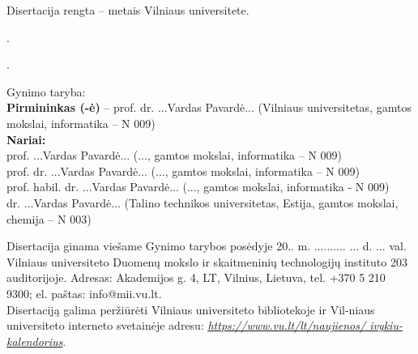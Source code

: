 \newpage
\thispagestyle{empty}                   %

\noindent\nohyphens{Disertacija rengta {\thesisPreparationStartYear}--{\thesisYear} metais Vilniaus universitete.}


\vspace{1cm}
.

.

\vspace{1cm}
\noindent
Gynimo taryba:  \\
{\bf Pirmininkas (-ė)} {-- {prof. dr. ...Vardas Pavardė...} (Vilniaus universitetas, gamtos mokslai, informatika -- N 009)\\}
{\bf Nariai:}\\ %
{prof. ...Vardas Pavardė...}
(..., gamtos mokslai, informatika -- N 009)\\
{prof. dr. ...Vardas Pavardė...}
(..., gamtos mokslai, informatika – N 009)\\
{prof. habil. dr. ...Vardas Pavardė...}
(..., gamtos mokslai, informatika - N 009)\\
{dr. ...Vardas Pavardė...}
(Talino technikos universitetas, Estija, gamtos mokslai, chemija -- N 003)


\vspace{2cm}
\noindent
Disertacija ginama viešame Gynimo tarybos posėdyje 20.. m. .......... ... d. ... val. Vilniaus universiteto Duomenų mokslo ir skaitmeninių technologijų instituto  203 auditorijoje. Adresas: Akademijos g. 4, LT, Vilnius, Lietuva, tel. +370 5 210 9300; el. paštas: info@mii.vu.lt.\\

\vspace{1cm}
\noindent
Disertaciją galima peržiūrėti Vilniaus universiteto bibliotekoje ir Vil-niaus universiteto interneto svetainėje adresu: 
\href{https://www.vu.lt/lt/naujienos/ivykiu-kalendorius}{ \textit{\underline{https://www.vu.lt/lt/naujienos/} \underline{ivykiu-kalendorius}}}. 

